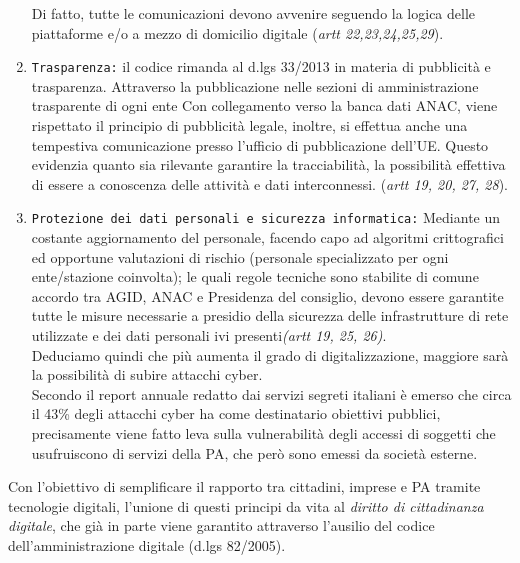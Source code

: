 \documentclass{article}
\begin{document}
\begin{justify}
\begin{enumerate}
        Di fatto, tutte le comunicazioni devono avvenire seguendo la logica delle piattaforme e/o a mezzo di domicilio digitale (\textit{artt 22,23,24,25,29}).
        \item \texttt{Trasparenza:} il codice rimanda al d.lgs 33/2013 in materia di pubblicità e trasparenza.
        Attraverso la pubblicazione nelle sezioni di amministrazione trasparente di ogni ente Con collegamento verso la banca dati ANAC, viene rispettato il principio di pubblicità legale, inoltre, si effettua anche una tempestiva comunicazione presso l'ufficio di pubblicazione dell'UE.
        Questo evidenzia quanto sia rilevante garantire la tracciabilità, la possibilità effettiva di essere a conoscenza delle attività e dati interconnessi. (\textit{artt 19, 20, 27, 28}).
        \item \texttt{Protezione dei dati personali e sicurezza informatica:} Mediante un costante aggiornamento del personale, facendo capo ad algoritmi crittografici ed opportune valutazioni di rischio (personale specializzato per ogni ente/stazione coinvolta); le quali regole tecniche sono stabilite di comune accordo tra AGID, ANAC e Presidenza del consiglio, devono essere garantite tutte le misure necessarie a presidio della sicurezza delle infrastrutture di rete utilizzate e dei dati personali ivi presenti\textit{(artt 19, 25, 26)}. \\Deduciamo quindi che più aumenta il grado di digitalizzazione, maggiore sarà la possibilità di subire attacchi cyber.\\
        Secondo il report annuale redatto dai servizi segreti italiani è emerso che circa il 43\% degli attacchi cyber ha come destinatario obiettivi pubblici, precisamente viene fatto leva sulla vulnerabilità degli accessi di soggetti che usufruiscono di servizi della PA, che però sono emessi da società esterne.\citep{ChiomentiPA}\\
        
    \end{enumerate}
    Con l'obiettivo di semplificare il rapporto tra cittadini, imprese e PA tramite tecnologie digitali, l'unione di questi principi da vita al \textit{diritto di cittadinanza digitale}, che già in parte viene garantito attraverso l'ausilio del codice dell'amministrazione digitale (d.lgs 82/2005).
\end{justify}
\end{document}
